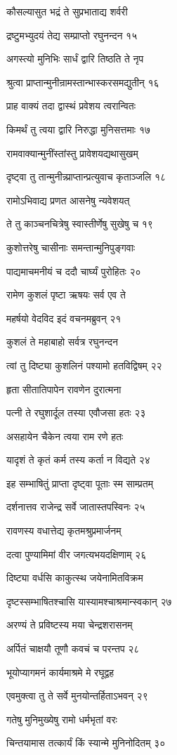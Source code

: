 कौसल्यासुत भद्रं ते सुप्रभाताद्य शर्वरी

द्रष्टुमभ्युदयं तेद्य सम्प्राप्तो रघुनन्दन १५

अगस्त्यो मुनिभिः सार्धं द्वारि तिष्ठति ते नृप

श्रुत्वा प्राप्तान्मुनीन्रामस्तान्भास्करसमद्युतीन् १६

प्राह वाक्यं तदा द्वास्थं प्रवेशय त्वरान्वितः

किमर्थं तु त्वया द्वारि निरुद्धा मुनिसत्तमाः १७

रामवाक्यान्मुनींस्तांस्तु प्रावेशयद्यथासुखम्

दृष्ट्वा तु तान्मुनीन्न्प्राप्तान्प्रत्युवाच कृताञ्जलि १८

रामोऽभिवाद्य प्रणत आसनेषु न्यवेशयत्

ते तु काञ्चनचित्रेषु स्वास्तीर्णेषु सुखेषु च १९

कुशोत्तरेषु चासीनाः समन्तान्मुनिपुङ्गवाः

पाद्यमाचमनीयं च ददौ चार्घ्यं पुरोहितः २०

रामेण कुशलं पृष्टा ऋषयः सर्व एव ते

महर्षयो वेदविद इदं वचनमब्रुवन् २१

कुशलं ते महाबाहो सर्वत्र रघुनन्दन

त्वां तु दिष्ट्या कुशलिनं पश्यामो हतविद्विषम् २२

हृता सीतातिपापेन रावणेन दुरात्मना

पत्नी ते रघुशार्दूल तस्या एवौजसा हतः २३

असहायेन चैकेन त्वया राम रणे हतः

यादृशं ते कृतं कर्म तस्य कर्ता न विद्यते २४

इह सम्भाषितुं प्राप्ता दृष्ट्वा पूताः स्म साम्प्रतम्

दर्शनात्तव राजेन्द्र सर्वे जातास्तपस्विनः २५

रावणस्य वधात्तेद्य कृतमश्रुप्रमार्जनम्

दत्वा पुण्यामिमां वीर जगत्यभयदक्षिणाम् २६

दिष्ट्या वर्धसि काकुत्स्थ जयेनामितविक्रम

दृष्टस्सम्भाषितश्चासि यास्यामश्चाश्रमान्स्वकान् २७

अरण्यं ते प्रविष्टस्य मया चेन्द्रशरासनम्

अर्पितं चाक्षयौ तूणौ कवचं च परन्तप २८

भूयोप्यागमनं कार्यमाश्रमे मे रघूद्वह

एवमुक्त्वा तु ते सर्वे मुनयोन्तर्हिताऽभवन् २९

गतेषु मुनिमुख्येषु रामो धर्मभृतां वरः

चिन्तयामास तत्कार्यं किं स्यान्मे मुनिनोदितम् ३०


